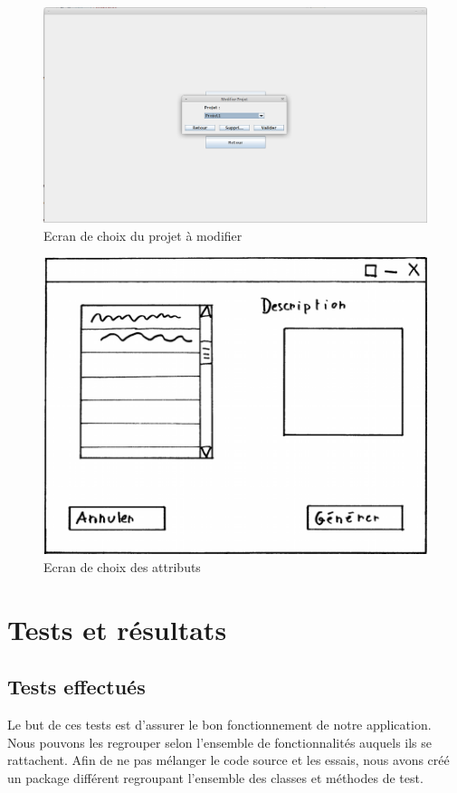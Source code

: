 \documentclass[12pt]{report}
\begin{document}
\begin{figure}
\centering
\includegraphics[scale=0.3]{IHM/modifier_projet_admin.png}
\caption{Ecran de choix du projet à modifier}
\end{figure}
\begin{figure}
\centering
\includegraphics[scale=0.25]{Generation.png}
\caption{Ecran de choix des attributs}
\end{figure}

\chapter{Tests et résultats}
\section{Tests effectués}
Le but de ces tests est d'assurer le bon fonctionnement de notre application. Nous pouvons les regrouper selon l'ensemble de fonctionnalités auquels ils se rattachent. Afin de ne pas mélanger le code source et les essais, nous avons créé un package différent regroupant l'ensemble des classes et méthodes de test. 
\end{document}
